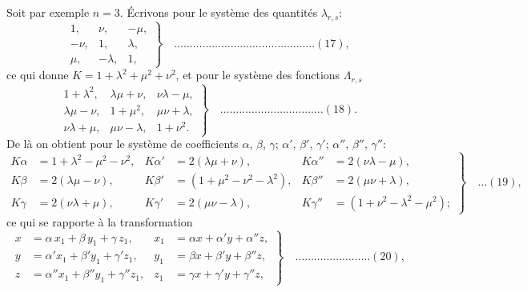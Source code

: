 \documentclass[12pt,a4paper]{article}
\theoremstyle{plain}
\begin{document}
Soit par exemple $n = 3$. \'Ecrivons pour le syst\`eme des quantit\'es $\lambda_{r,s}$:
\[
\left. \begin{array}{rrr}
1, & \nu, & -\mu, \\
-\nu, & 1, & \lambda, \\
\mu, & -\lambda, & 1,
\end{array} \right\} \quad \ldots \ldots \ldots \ldots \ldots \ldots \ldots \ldots \ldots \ldots \ldots \ldots \ldots \ldots \ldots (17),
\]
ce qui donne $K = 1 + \lambda^2 + \mu^2 + \nu^2$, et pour le syst\`eme des fonctions $\Lambda_{r,s}$
\[
\left. \begin{array}{ccc}
1 + \lambda^2, & \lambda\mu + \nu, & \nu\lambda - \mu, \\
\lambda\mu - \nu, & 1 + \mu^2, & \mu\nu + \lambda, \\
\nu\lambda + \mu, & \mu\nu - \lambda, & 1 + \nu^2.
\end{array} \right\} \quad \ldots \ldots \ldots \ldots \ldots \ldots \ldots \ldots \ldots \ldots \ldots (18).
\]
De l\`a on obtient pour le syst\`eme de coefficients $\alpha$, $\beta$, $\gamma$; $\alpha'$, $\beta'$, $\gamma'$; $\alpha''$, $\beta''$, $\gamma''$:
\[
\left. \begin{aligned}
K\alpha &= 1 + \lambda^2 - \mu^2 - \nu^2, & K\alpha' &= 2(\lambda\mu + \nu), & K\alpha'' &= 2(\nu\lambda - \mu), \\
K\beta &= 2(\lambda\mu - \nu), & K\beta' &= (1 + \mu^2 - \nu^2 - \lambda^2), & K\beta'' &= 2(\mu\nu + \lambda), \\
K\gamma &= 2(\nu\lambda + \mu), & K\gamma' &= 2(\mu\nu - \lambda), & K\gamma'' &= (1 + \nu^2 - \lambda^2 - \mu^2);
\end{aligned} \right\} \quad \ldots (19),
\]
ce qui se rapporte \`a la transformation
\[
\left. \begin{aligned}
x &= \alpha\, x_1 + \beta\, y_1 + \gamma\, z_1, & x_1 &= \alpha x + \alpha' y + \alpha'' z, \\
y &= \alpha' x_1 + \beta' y_1 + \gamma' z_1, & y_1 &= \beta x + \beta' y + \beta'' z, \\
z &= \alpha'' x_1 + \beta'' y_1 + \gamma'' z_1, & z_1 &= \gamma x + \gamma' y + \gamma'' z,
\end{aligned} \right\} \quad \ldots \ldots \ldots \ldots \ldots \ldots \ldots \ldots (20),
\]
\end{document}
